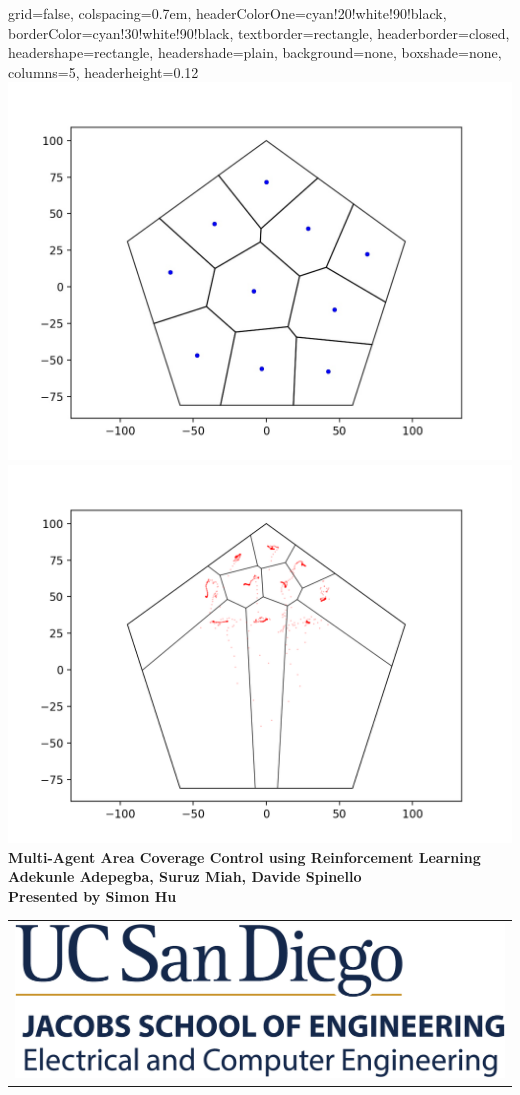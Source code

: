 \documentclass[landscape,a0paper,fontscale=0.292]{baposter}
\begin{document}
\begin{poster}{
grid=false, 
colspacing=0.7em,
headerColorOne=cyan!20!white!90!black,
borderColor=cyan!30!white!90!black,	
textborder=rectangle,
headerborder=closed,
headershape=rectangle,
headershade=plain,
background=none,
boxshade=none,
columns=5,
headerheight=0.12\textheight}
{
	\includegraphics[scale=0.2]{voronoi_partition}
	\includegraphics[scale=0.2]{gaussian_simulation_1}
}
{\sc\huge\bf Multi-Agent Area Coverage Control using Reinforcement Learning}	
{\Large \bf Adekunle Adepegba, Suruz Miah, Davide Spinello 
\\
Presented by Simon Hu}
{
	\begin{tabular}{r}
		\includegraphics[scale=0.5]{logo}
	\end{tabular}
}


\end{poster}
\end{document}
